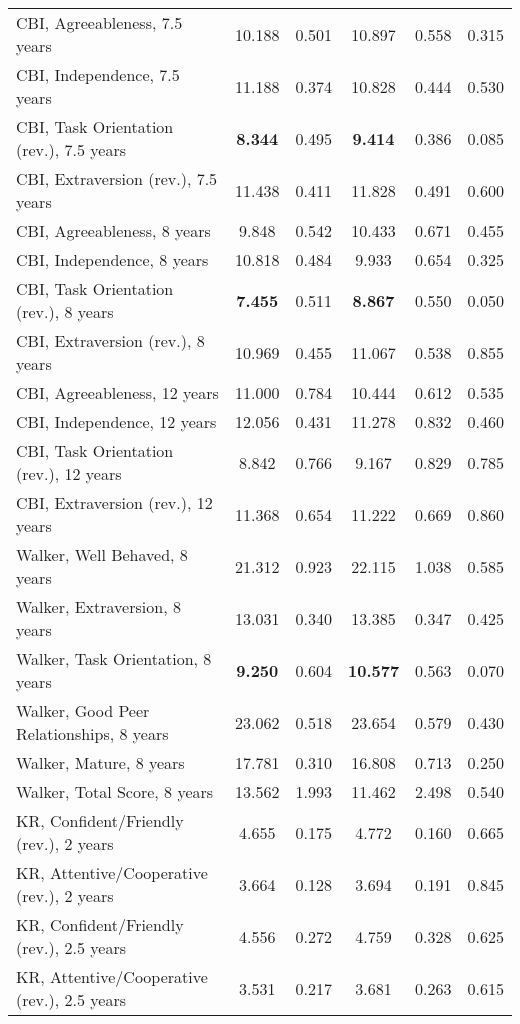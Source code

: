 \begin{tabular}{l c c c c c}
CBI, Agreeableness, 7.5 years & 10.188 & 0.501 &  10.897 & 0.558 & 0.315 \\
CBI, Independence, 7.5 years & 11.188 & 0.374 &  10.828 & 0.444 & 0.530 \\
CBI, Task Orientation (rev.), 7.5 years & \textbf{8.344} & 0.495 &  \textbf{9.414} & 0.386 & 0.085 \\
CBI, Extraversion (rev.), 7.5 years & 11.438 & 0.411 &  11.828 & 0.491 & 0.600 \\
CBI, Agreeableness, 8 years & 9.848 & 0.542 &  10.433 & 0.671 & 0.455 \\
CBI, Independence, 8 years & 10.818 & 0.484 &  9.933 & 0.654 & 0.325 \\
CBI, Task Orientation (rev.), 8 years & \textbf{7.455} & 0.511 &  \textbf{8.867} & 0.550 & 0.050 \\
CBI, Extraversion (rev.), 8 years & 10.969 & 0.455 &  11.067 & 0.538 & 0.855 \\
CBI, Agreeableness, 12 years & 11.000 & 0.784 &  10.444 & 0.612 & 0.535 \\
CBI, Independence, 12 years & 12.056 & 0.431 &  11.278 & 0.832 & 0.460 \\
CBI, Task Orientation (rev.), 12 years & 8.842 & 0.766 &  9.167 & 0.829 & 0.785 \\
CBI, Extraversion (rev.), 12 years & 11.368 & 0.654 &  11.222 & 0.669 & 0.860 \\
Walker, Well Behaved, 8 years & 21.312 & 0.923 &  22.115 & 1.038 & 0.585 \\
Walker, Extraversion, 8 years & 13.031 & 0.340 &  13.385 & 0.347 & 0.425 \\
Walker, Task Orientation, 8 years & \textbf{9.250} & 0.604 &  \textbf{10.577} & 0.563 & 0.070 \\
Walker, Good Peer Relationships, 8 years & 23.062 & 0.518 &  23.654 & 0.579 & 0.430 \\
Walker, Mature, 8 years & 17.781 & 0.310 &  16.808 & 0.713 & 0.250 \\
Walker, Total Score, 8 years & 13.562 & 1.993 &  11.462 & 2.498 & 0.540 \\
KR, Confident/Friendly (rev.), 2 years & 4.655 & 0.175 &  4.772 & 0.160 & 0.665 \\
KR, Attentive/Cooperative (rev.), 2 years & 3.664 & 0.128 &  3.694 & 0.191 & 0.845 \\
KR, Confident/Friendly (rev.), 2.5 years & 4.556 & 0.272 &  4.759 & 0.328 & 0.625 \\
KR, Attentive/Cooperative (rev.), 2.5 years & 3.531 & 0.217 &  3.681 & 0.263 & 0.615 \\

\end{tabular}

